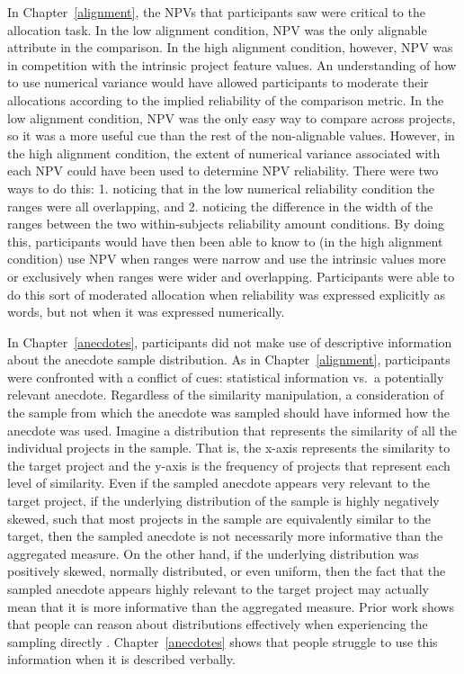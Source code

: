 \documentclass[a4paper, nobind, dvipsnames]{templates/ociamthesis}
\theoremstyle{definition}
\theoremstyle{definition}
\theoremstyle{definition}
\theoremstyle{definition}
\theoremstyle{remark}
\begin{document}
In Chapter~\ref{alignment}, the NPVs that participants saw were critical to the
allocation task. In the low alignment condition, NPV was the only alignable
attribute in the comparison. In the high alignment condition, however, NPV was
in competition with the intrinsic project feature values. An understanding of
how to use numerical variance would have allowed participants to moderate their
allocations according to the implied reliability of the comparison metric. In
the low alignment condition, NPV was the only easy way to compare across
projects, so it was a more useful cue than the rest of the non-alignable values.
However, in the high alignment condition, the extent of numerical variance
associated with each NPV could have been used to determine NPV reliability.
There were two ways to do this: 1. noticing that in the low numerical
reliability condition the ranges were all overlapping, and 2. noticing the
difference in the width of the ranges between the two within-subjects
reliability amount conditions. By doing this, participants would have then been
able to know to (in the high alignment condition) use NPV when ranges were
narrow and use the intrinsic values more or exclusively when ranges were wider
and overlapping. Participants were able to do this sort of moderated allocation
when reliability was expressed explicitly as words, but not when it was
expressed numerically.

In Chapter~\ref{anecdotes}, participants did not make use of descriptive
information about the anecdote sample distribution. As in
Chapter~\ref{alignment}, participants were confronted with a conflict of cues:
statistical information vs.~a potentially relevant anecdote. Regardless of the
similarity manipulation, a consideration of the sample from which the anecdote
was sampled should have informed how the anecdote was used. Imagine a
distribution that represents the similarity of all the individual projects in
the sample. That is, the x-axis represents the similarity to the target project
and the y-axis is the frequency of projects that represent each level of
similarity. Even if the sampled anecdote appears very relevant to the target
project, if the underlying distribution of the sample is highly negatively
skewed, such that most projects in the sample are equivalently similar to the
target, then the sampled anecdote is not necessarily more informative than the
aggregated measure. On the other hand, if the underlying distribution was
positively skewed, normally distributed, or even uniform, then the fact that the
sampled anecdote appears highly relevant to the target project may actually mean
that it is more informative than the aggregated measure. Prior work shows that
people can reason about distributions effectively when experiencing the sampling
directly \autocites[e.g.,][]{hertwig2004,carvalho2021}. Chapter~\ref{anecdotes} shows
that people struggle to use this information when it is described verbally.
\end{document}
